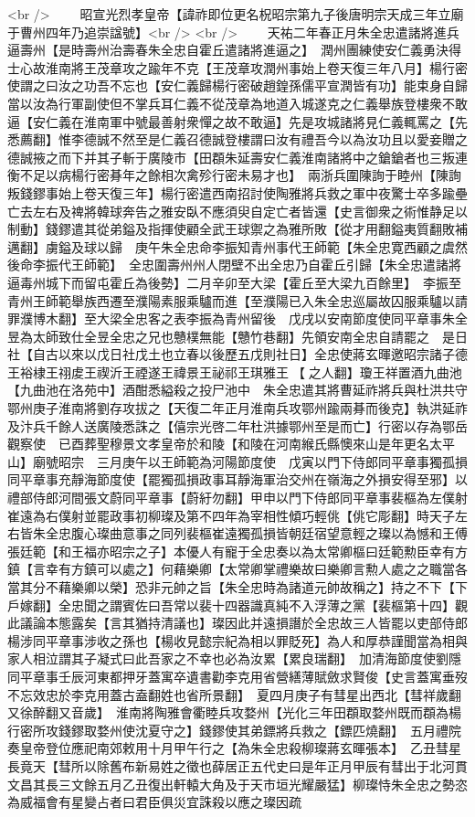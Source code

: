 <br />
　　昭宣光烈孝皇帝【諱祚即位更名柷昭宗第九子後唐明宗天成三年立廟于曹州四年乃追崇諡號】<br />
<br />
　　天祐二年春正月朱全忠遣諸將進兵逼壽州【是時壽州治壽春朱全忠自霍丘遣諸將進逼之】　潤州團練使安仁義勇決得士心故淮南將王茂章攻之踰年不克【王茂章攻潤州事始上卷天復三年八月】楊行密使謂之曰汝之功吾不忘也【安仁義歸楊行密破趙鍠孫儒平宣潤皆有功】能束身自歸當以汝為行軍副使但不掌兵耳仁義不從茂章為地道入城遂克之仁義舉族登樓衆不敢逼【安仁義在淮南軍中號最善射衆憚之故不敢逼】先是攻城諸將見仁義輒罵之【先悉薦翻】惟李德誠不然至是仁義召德誠登樓謂曰汝有禮吾今以為汝功且以愛妾贈之德誠掖之而下并其子斬于廣陵市【田頵朱延壽安仁義淮南諸將中之鎗鎗者也三叛連衡不足以病楊行密朞年之餘相次禽殄行密未易才也】　兩浙兵圍陳詢于睦州【陳詢叛錢鏐事始上卷天復三年】楊行密遣西南招討使陶雅將兵救之軍中夜驚士卒多踰壘亡去左右及禆將韓球奔告之雅安臥不應須臾自定亡者皆還【史言御衆之術惟静足以制動】錢鏐遣其從弟鎰及指揮使顧全武王球禦之為雅所敗【從才用翻鎰夷質翻敗補邁翻】虜鎰及球以歸　庚午朱全忠命李振知青州事代王師範【朱全忠寛西顧之虞然後命李振代王師範】　全忠圍壽州州人閉壁不出全忠乃自霍丘引歸【朱全忠遣諸將逼毒州城下而留屯霍丘為後勢】二月辛卯至大梁【霍丘至大梁九百餘里】　李振至青州王師範舉族西遷至濮陽素服乘驢而進【至濮陽已入朱全忠巡屬故囚服乘驢以請罪濮博木翻】至大梁全忠客之表李振為青州留後　戊戌以安南節度使同平章事朱全昱為太師致仕全昱全忠之兄也戇樸無能【戇竹巷翻】先領安南全忠自請罷之　是日社【自古以來以戊日社戊土也立春以後歷五戊則社日】全忠使蔣玄暉邀昭宗諸子德王裕棣王祤䖍王禊沂王禋遂王禕景王祕祁王琪雅王【之人翻】瓊王祥置酒九曲池【九曲池在洛苑中】酒酣悉縊殺之投尸池中　朱全忠遣其將曹延祚將兵與杜洪共守鄂州庚子淮南將劉存攻拔之【天復二年正月淮南兵攻鄂州踰兩朞而後克】執洪延祚及汴兵千餘人送廣陵悉誅之【僖宗光啓二年杜洪據鄂州至是而亡】行密以存為鄂岳觀察使　已酉葬聖穆景文孝皇帝於和陵【和陵在河南緱氏縣懊來山是年更名太平山】廟號昭宗　三月庚午以王師範為河陽節度使　戊寅以門下侍郎同平章事獨孤損同平章事充靜海節度使【罷獨孤損政事耳靜海軍治交州在嶺海之外損安得至邪】以禮部侍郎河間張文蔚同平章事【蔚紆勿翻】甲申以門下侍郎同平章事裴樞為左僕射崔遠為右僕射並罷政事初柳璨及第不四年為宰相性傾巧輕佻【佻它彫翻】時天子左右皆朱全忠腹心璨曲意事之同列裴樞崔遠獨孤損皆朝廷宿望意輕之璨以為憾和王傅張廷範【和王福亦昭宗之子】本優人有寵于全忠奏以為太常卿樞曰廷範勲臣幸有方鎮【言幸有方鎮可以處之】何藉樂卿【太常卿掌禮樂故曰樂卿言勲人處之之職當各當其分不藉樂卿以榮】恐非元帥之旨【朱全忠時為諸道元帥故稱之】持之不下【下戶嫁翻】全忠聞之謂賓佐曰吾常以裴十四器識真純不入浮薄之黨【裴樞第十四】觀此議論本態露矣【言其猶持清議也】璨因此并遠損譖於全忠故三人皆罷以吏部侍郎楊涉同平章事涉收之孫也【楊收見懿宗紀為相以罪貶死】為人和厚恭謹聞當為相與家人相泣謂其子凝式曰此吾家之不幸也必為汝累【累良瑞翻】　加清海節度使劉隱同平章事壬辰河東都押牙蓋寓卒遺書勸李克用省營繕薄賦斂求賢俊【史言蓋寓垂歿不忘效忠於李克用蓋古盍翻姓也省所景翻】　夏四月庚子有彗星出西北【彗祥歲翻又徐醉翻又音歲】　淮南將陶雅會衢睦兵攻婺州【光化三年田頵取婺州既而頵為楊行密所攻錢鏐取婺州使沈夏守之】錢鏐使其弟鏢將兵救之【鏢匹燒翻】　五月禮院奏皇帝登位應祀南郊敕用十月甲午行之【為朱全忠殺柳璨蔣玄暉張本】　乙丑彗星長竟天【彗所以除舊布新易姓之徵也薛居正五代史曰是年正月甲辰有彗出于北河貫文昌其長三文餘五月乙丑復出軒轅大角及于天市垣光耀嚴猛】柳璨恃朱全忠之勢恣為威福會有星變占者曰君臣俱災宜誅殺以應之璨因疏
